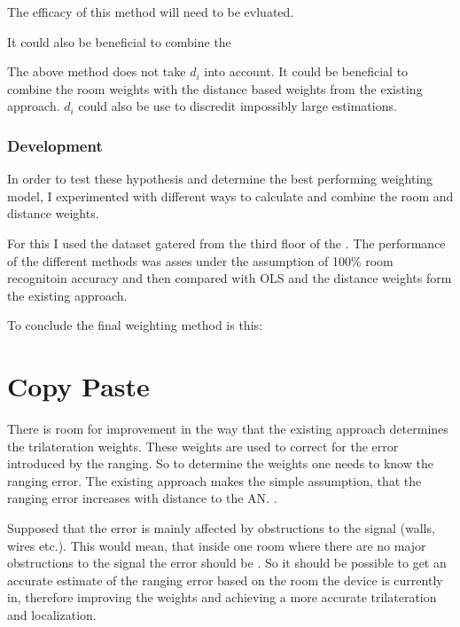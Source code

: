 The efficacy of this method will need to be evluated.

It could also be beneficial to combine the 

The above method does not take \(d_i\) into account. It could be beneficial to combine the room weights with the distance based weights from the existing approach. \(d_i\) could also be use to discredit impossibly large estimations.


\subsubsection{Development}
\label{WeightingModelDefinition}

In order to test these hypothesis and determine the best performing weighting model, I experimented with different ways to calculate and combine the room and distance weights.

For this I used the dataset gatered from the third floor of the . The performance of the different methods was asses under the assumption of 100\% room recognitoin accuracy and then compared with OLS and the distance weights form the existing approach.


To conclude the final weighting method is this:



\section{Copy Paste}
There is room for improvement in the way that the existing approach determines the trilateration weights. These weights are used to correct for the error introduced by the ranging. So to determine the weights one needs to know the ranging error. The existing approach makes the simple assumption, that the ranging error increases with distance to the AN. .

Supposed that the error is mainly affected by obstructions to the signal (walls, wires etc.). This would mean, that inside one room where there are no major obstructions to the signal the error should be . So it should be possible to get an accurate estimate of the ranging error based on the room the device is currently in, therefore improving the weights and achieving a more accurate trilateration and localization.

